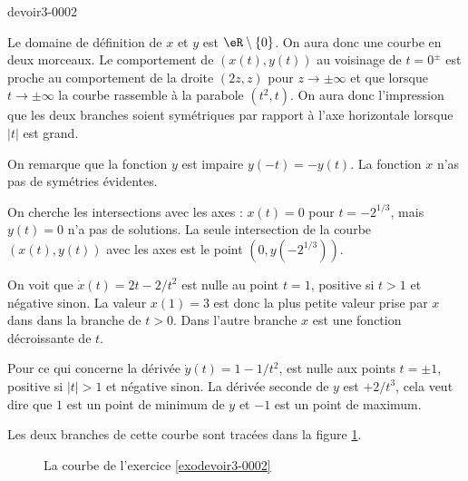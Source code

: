 \begin{corrige}{devoir3-0002}

  Le domaine de définition de $x$ et $y$ est $\eR\setminus\{0\}$. On aura donc une courbe en deux morceaux. Le comportement de $(x(t), y(t))$ au voisinage de $t=0^{\pm}$ est proche au comportement de la droite $(2z, z)$ pour $z\to \pm\infty$ et que lorsque $t\to \pm\infty$ la courbe rassemble à la parabole $(t^2, t)$. On aura donc l'impression que les deux branches soient symétriques par rapport à l'axe horizontale lorsque $|t|$ est grand. 

On remarque que la fonction $y$ est impaire $y(-t)= - y(t)$. La fonction $x$ n'as pas de symétries évidentes. 

On cherche les intersections avec les axes : $x(t)=0$ pour $t= -2^{1/3}$, mais $y(t)=0$ n'a pas de solutions. La seule intersection de la courbe $(x(t),y(t))$ avec les axes est le point  $(0, y(-2^{1/3}))$.   

On voit que $\dot x (t)= 2t -2/t^2$ est nulle au point $t=1$, positive si $t>1$ et négative sinon. La valeur $x(1)=3$ est donc la plus petite valeur prise par $x$ dans dans la branche de $t>0$. Dans l'autre branche $x$ est une fonction décroissante de $t$.   

Pour ce qui concerne la dérivée $\dot y (t) = 1-1/t^2$, est nulle aux points $t=\pm 1$, positive si $|t|>1$ et négative sinon. La dérivée seconde de $y$ est $+2/t^3$, cela veut dire que $1$ est un point de minimum de $y$ et $-1$ est un point de maximum. 

Les deux branches de cette courbe sont tracées dans la figure \ref{figdevoir3exo2}.

\begin{figure}
  \begin{center}

  \caption{La courbe de l'exercice \ref{exodevoir3-0002}}\label{figdevoir3exo2}
  \end{center}
 \end{figure}
\end{corrige}
